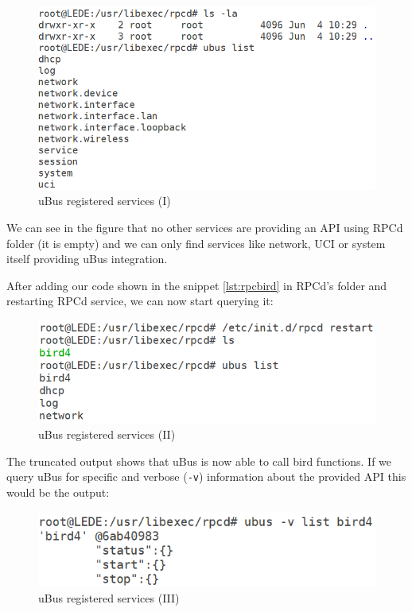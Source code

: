 \begin{figure}[H]
    \centering
    \includegraphics[width=\textwidth]{images/luci2/step1}
    \caption{uBus registered services (I)}
    \label{fig:ubusrs1}
\end{figure}

We can see in the figure that no other services are providing an API using RPCd folder (it is empty) and we can only find services like network, UCI or system itself providing uBus integration.

After adding our code shown in the snippet \ref{lst:rpcbird} in RPCd's folder and restarting RPCd service, we can now start querying it:

\begin{figure}[H]
    \centering
    \includegraphics[width=\textwidth]{images/luci2/step2}
    \caption{uBus registered services (II)}
    \label{fig:ubusrs2}
\end{figure}

The truncated output shows that uBus is now able to call bird functions. If we query uBus for specific and verbose (\texttt{-v}) information about the provided API this would be the output:

\begin{figure}[H]
    \centering
    \includegraphics[width=\textwidth]{images/luci2/step3}
    \caption{uBus registered services (III)}
    \label{fig:ubusrs3}
\end{figure}

